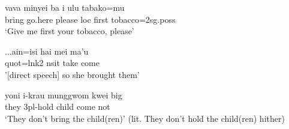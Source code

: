 \ea \label{Tajio023}
\gll vava minyei ba i ulu tabako=mu \\
bring go.here please \acs{loc} first tobacco=\acs{2}\acs{sg}.\acs{poss} \\
\glft ‘Give me first your tobacco, please' \\ 
\z
\xe

\ea \label{Makalero089}
\gll ...ain=isi hai mei ma’u \\
\acs{quot}=\acs{lnk}\acs{2} \acs{nsit} take come \\
\glft '[direct speech] so she brought
them' \\ 
\z
\xe

\ea \label{Hatam066}
\gll yoni i-krau munggwom kwei big \\
they \acs{3}\acs{pl}-hold child come not \\
\glft `They don't bring the child(ren)' (lit. They don't hold the child(ren) hither) \\ 
\z
\xe

